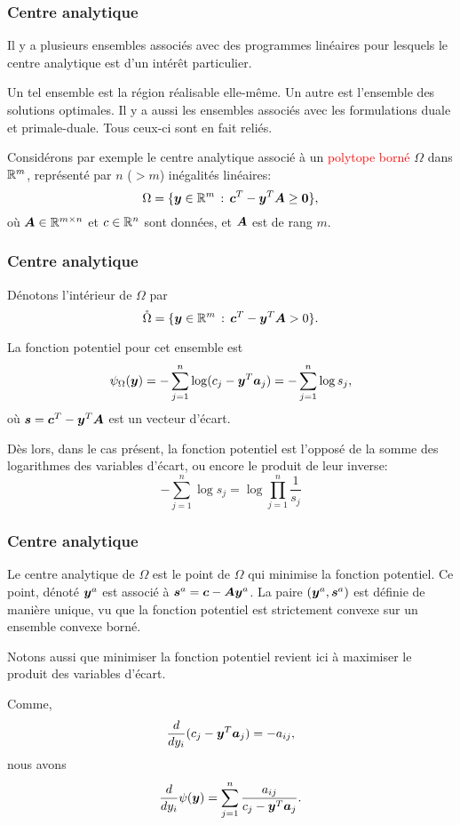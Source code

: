 \documentclass[usepdftitle=false, aspectratio=169]{beamer}
\begin{document}
\begin{frame}
\frametitle{Centre analytique}

Il y a plusieurs ensembles associés avec des programmes linéaires pour lesquels le centre analytique est d'un intérêt particulier.

\mbox{}

Un tel ensemble est la région réalisable elle-même. Un autre est l'ensemble des solutions optimales. Il y a aussi les ensembles associés avec les formulations duale et primale-duale. Tous ceux-ci sont en fait reliés.

\mbox{}

Considérons par exemple le centre analytique associé à un \textcolor{red}{polytope borné} $\Omega$ dans ${\mathbb{R}}^m$, représenté par $n$ ($> m$) inégalités linéaires:
\[
\Omega = \lbrace {\boldsymbol{y}} \in {\mathbb{R}}^m \,:\, {\boldsymbol{c}}^T - {\boldsymbol{y}}^T {\boldsymbol{A}} \geq {\boldsymbol{0}} \rbrace,
\]
où ${\boldsymbol{A}} \in {\mathbb{R}}^{m \times n}$ et $c \in {\mathbb{R}}^n$ sont données, et ${\boldsymbol{A}}$ est de rang $m$.

\end{frame}

\begin{frame}
\frametitle{Centre analytique}

Dénotons l'intérieur de $\Omega$ par
\[
\mathring{\Omega} = \lbrace {\boldsymbol{y}} \in {\mathbb{R}}^m \,:\, {\boldsymbol{c}}^T - {\boldsymbol{y}}^T{\boldsymbol{A}} > 0 \rbrace.
\]

\mbox{}

La fonction potentiel pour cet ensemble est
\[
\psi_{\Omega} ({\boldsymbol{y}}) = - \sum_{j = 1}^n \log (c_j - {\boldsymbol{y}}^T{\boldsymbol{a}}_j) = -\sum_{j = 1}^n \log s_j,
\]
où ${\boldsymbol{s}} = {\boldsymbol{c}}^T - {\boldsymbol{y}}^T{\boldsymbol{A}}$ est un vecteur d'écart.

\mbox{}

Dès lors, dans le cas présent, la fonction potentiel est l'opposé de la somme des logarithmes des variables d'écart, ou encore le produit de leur inverse:
$$
-\sum_{j = 1}^n \log s_j = \log \prod_{j = 1}^n \frac{1}{s_j}
$$

\end{frame}

\begin{frame}
\frametitle{Centre analytique}

Le centre analytique de $\Omega$ est le point de $\Omega$ qui minimise la fonction potentiel. Ce point, dénoté ${\boldsymbol{y}}^a$ est associé à ${\boldsymbol{s}}^a = {\boldsymbol{c}} - {\boldsymbol{A}}{\boldsymbol{y}}^a$. La paire $({\boldsymbol{y}}^a, {\boldsymbol{s}}^a)$ est définie de manière unique, vu que la fonction potentiel est strictement convexe sur un ensemble convexe borné.

\mbox{}

Notons aussi que minimiser la fonction potentiel revient ici à maximiser le produit des variables d'écart.

\mbox{}

Comme,
$$
\frac{d}{dy_i} (c_j-{\boldsymbol{y}}^T{\boldsymbol{a}}_j) = -a_{ij},
$$
nous avons
$$
\frac{d}{dy_i} \psi({\boldsymbol{y}}) = \sum_{j = 1}^n \frac{a_{ij}}{c_j - {\boldsymbol{y}}^T{\boldsymbol{a}}_j}.
$$

\end{frame}
\end{document}
